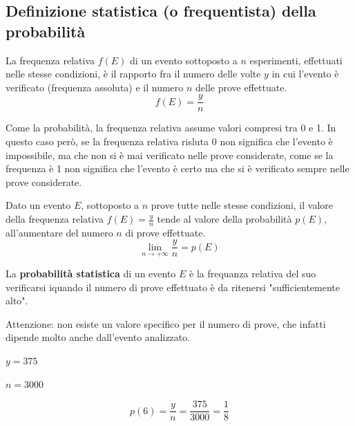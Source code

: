 \documentclass{article}     %
\begin{document}
                \subsection{Definizione statistica (o frequentista) della probabilità}
                    \begin{boxdef}
                        La frequenza relativa $f(E)$ di un evento sottoposto a $n$ esperimenti, effettuati nelle stesse condizioni, è il rapporto fra il numero delle volte $y$ in cui l'evento è verificato (frequenza assoluta) e il numero $n$ delle prove effettuate.
                        \[f(E)=\frac{y}{n}\]
                    \end{boxdef}
                    Come la probabilità, la frequenza relativa assume valori compresi tra 0 e 1. In questo caso però, se la frequenza relativa risluta 0 non significa che l'evento è impossibile, ma che non si è mai verificato nelle prove considerate, come se la frequenza è 1 non significa che l'evento è certo ma che si è verificato sempre nelle prove considerate. 
                    \begin{thm}
                        Dato un evento $E$, sottoposto a $n$ prove tutte nelle stesse condizioni, il valore della frequenza relativa $f(E)=\frac{y}{n}$ tende al valore della probabilità $p(E)$, all'aumentare del numero $n$ di prove effettuate.
                        \[\lim_{n\rightarrow +\infty}\frac{y}{n}=p(E)\]
                    \end{thm}
                    \begin{boxdef}
                        La \textbf{probabilità statistica} di un evento $E$ è la frequanza relativa del suo verificarsi iquando il numero di prove effettuato è da ritenersi "sufficientemente alto".
                    \end{boxdef}
                    Attenzione: non esiste un valore specifico per il numero di prove, che infatti dipende molto anche dall'evento analizzato. 
                    \begin{ex}
                        
                        $y=375$
                        
                        $n=3000$
                        
                        \[p(6)=\frac{y}{n}=\frac{375}{3000}=\frac{1}{8}\]
                    \end{ex}
\end{document}
